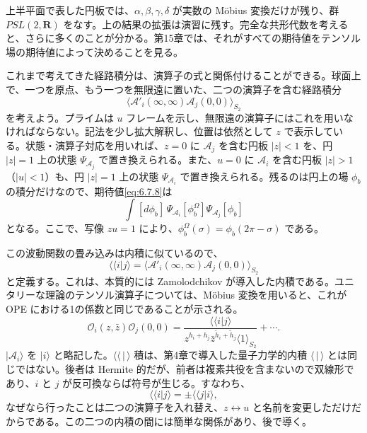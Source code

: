 上半平面で表した円板では、$\alpha,\beta,\gamma,\delta$ が実数の Möbius 変換だけが残り、群 $PSL(2,\mathbf R)$ をなす。上の結果の拡張は演習に残す。完全な共形代数を考えると、さらに多くのことが分かる。第15章では、それがすべての期待値をテンソル場の期待値によって決めることを見る。


これまで考えてきた経路積分は、演算子の式と関係付けることができる。球面上で、一つを原点、もう一つを無限遠に置いた、二つの演算子を含む経路積分
\begin{equation}
\langle\mathcal A'_i(\infty,\infty)\mathcal A_j(0,0)\rangle_{S_2}
\tag{6.7.8}\label{eq:6.7.8}
\end{equation}
を考えよう。プライムは $u$ フレームを示し、無限遠の演算子にはこれを用いなければならない。記法を少し拡大解釈し、位置は依然として $z$ で表示している。状態・演算子対応を用いれば、$z=0$ に $\mathcal A_j$ を含む円板 $|z|<1$ を、円 $|z|=1$ 上の状態 $\Psi_{\mathcal A_j}$ で置き換えられる。また、$u=0$ に $\mathcal A_i$ を含む円板 $|z|>1$（$|u|<1$）も、円 $|z|=1$ 上の状態 $\Psi_{\mathcal A_i}$ で置き換えられる。残るのは円上の場 $\phi_b$ の積分だけなので、期待値\eqref{eq:6.7.8}は
\begin{equation}
\int[d\phi_b]\,\Psi_{\mathcal A_i}[\phi_b^\Omega]\Psi_{\mathcal A_j}[\phi_b]
\tag{6.7.9}\label{eq:6.7.9}
\end{equation}
となる。ここで、写像 $zu=1$ により、$\phi_b^\Omega(\sigma)=\phi_b(2\pi-\sigma)$ である。

この波動関数の畳み込みは内積に似ているので、
\begin{equation}
\langle\!\langle i|j\rangle
=\langle\mathcal A'_i(\infty,\infty)\mathcal A_j(0,0)\rangle_{S_2}
\tag{6.7.10}\label{eq:6.7.10}
\end{equation}
と定義する。これは、本質的には Zamolodchikov が導入した内積である。ユニタリーな理論のテンソル演算子については、Möbius 変換を用いると、これが OPE における1の係数と同じであることが示される。
\begin{equation}
\mathcal O_i(z,\bar z)\mathcal O_j(0,0)
=\frac{\langle\!\langle i|j\rangle}
{z^{h_i+h_j}\bar z^{\widetilde h_i+\widetilde h_j}\langle1\rangle_{S_2}}
+\cdots.
\tag{6.7.11}\label{eq:6.7.11}
\end{equation}
$|\mathcal A_i\rangle$ を $|i\rangle$ と略記した。$\langle\!\langle\,|\,\rangle$ 積は、第4章で導入した量子力学的内積 $\langle\,|\,\rangle$ とは同じではない。後者は Hermite 的だが、前者は複素共役を含まないので双線形であり、$i$ と $j$ が反可換ならば符号が生じる。すなわち、
\begin{equation}
\langle\!\langle i|j\rangle=\pm\langle\!\langle j|i\rangle,
\tag{6.7.12}\label{eq:6.7.12}
\end{equation}
なぜなら行ったことは二つの演算子を入れ替え、$z\leftrightarrow u$ と名前を変更しただけだからである。この二つの内積の間には簡単な関係があり、後で導く。

